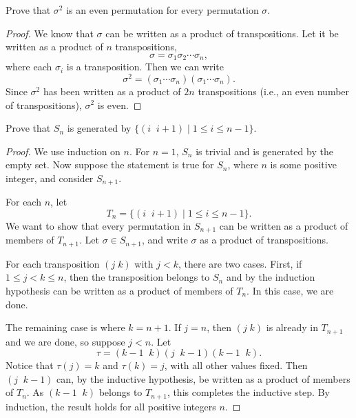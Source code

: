  Prove that $\sigma^2$ is an even permutation for every
permutation $\sigma$.
\begin{proof}
  We know that $\sigma$ can be written as a product of
  transpositions. Let it be written as a product of $n$
  transpositions,
  \begin{equation*}
    \sigma = \sigma_1\sigma_2\cdots\sigma_n,
  \end{equation*}
  where each $\sigma_i$ is a transposition. Then we can write
  \begin{equation*}
    \sigma^2 = (\sigma_1\cdots\sigma_n)(\sigma_1\cdots\sigma_n).
  \end{equation*}
  Since $\sigma^2$ has been written as a product of $2n$
  transpositions (i.e., an even number of transpositions), $\sigma^2$
  is even.
\end{proof}

 \label{exercise:quotient-group:S-n-gen-adj}
Prove that $S_n$ is generated by
$\{(i\;\;i+1) \mid 1\leq i\leq n - 1\}$.
\begin{proof}
  We use induction on $n$. For $n = 1$, $S_n$ is trivial and is
  generated by the empty set. Now suppose the statement is true for
  $S_n$, where $n$ is some positive integer, and consider $S_{n+1}$.

  For each $n$, let
  \begin{equation*}
    T_n = \{(i\;\;i+1) \mid 1\leq i\leq n-1\}.
  \end{equation*}
  We want to show that every permutation in $S_{n+1}$ can be written
  as a product of members of $T_{n+1}$. Let $\sigma\in S_{n+1}$, and
  write $\sigma$ as a product of transpositions.

  For each transposition $(j\;k)$ with $j < k$, there are two
  cases. First, if $1\leq j < k \leq n$, then the transposition
  belongs to $S_n$ and by the induction hypothesis can be written as a
  product of members of $T_n$. In this case, we are done.

  The remaining case is where $k = n+1$. If $j = n$, then $(j\;k)$ is
  already in $T_{n+1}$ and we are done, so suppose $j < n$. Let
  \begin{equation*}
    \tau = (k - 1\;\;k)(j\;\;k-1)(k-1\;\;k).
  \end{equation*}
  Notice that $\tau(j) = k$ and $\tau(k) = j$, with all other values
  fixed. Then $(j\;\;k-1)$ can, by the inductive hypothesis, be
  written as a product of members of $T_n$. As $(k-1\;\;k)$ belongs to
  $T_{n+1}$, this completes the inductive step. By induction, the
  result holds for all positive integers $n$.
\end{proof}

